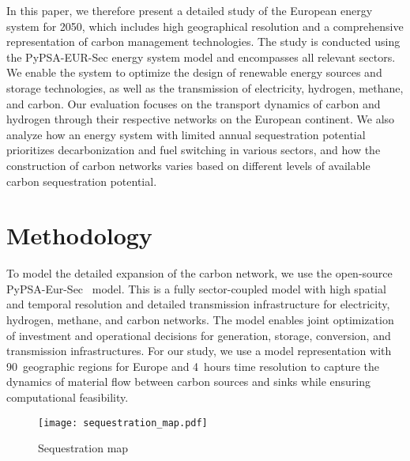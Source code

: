 \documentclass[conference]{IEEEtran}
\begin{document}
In this paper, we therefore present a detailed study of the European energy system for 2050, which includes high geographical resolution and a comprehensive representation of carbon management technologies. The study is conducted using the PyPSA-EUR-Sec energy system model and encompasses all relevant sectors. We enable the system to optimize the design of renewable energy sources and storage technologies, as well as the transmission of electricity, hydrogen, methane, and carbon. Our evaluation focuses on the transport dynamics of carbon and hydrogen through their respective networks on the European continent. We also analyze how an energy system with limited annual sequestration potential prioritizes decarbonization and fuel switching in various sectors, and how the construction of carbon networks varies based on different levels of available carbon sequestration potential.


\section{Methodology}
\label{sec:methodology}

To model the detailed expansion of the carbon network, we use the open-source PyPSA-Eur-Sec~\cite{PyPSAEurSecSectorCoupledOpen2023} model. This is a fully sector-coupled model with high spatial and temporal resolution and detailed transmission infrastructure for electricity, hydrogen, methane, and carbon networks. The model enables joint optimization of investment and operational decisions for generation, storage, conversion, and transmission infrastructures. For our study, we use a model representation with 90~geographic regions for Europe and 4~hours time resolution to capture the dynamics of material flow between carbon sources and sinks while ensuring computational feasibility.

\begin{figure}
    \centering
    \texttt{[image: sequestration\_map.pdf]}
    \caption{Sequestration map}
    \label{fig:sequestration_map}
\end{figure}
\end{document}

